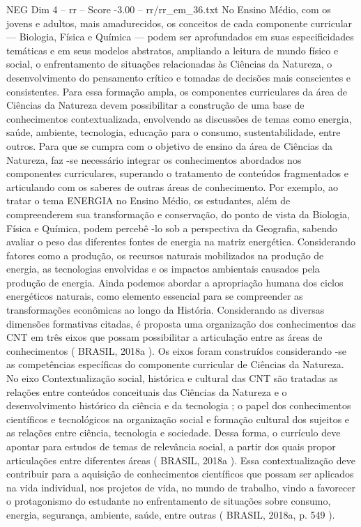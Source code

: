 \begin{textsample}{NEG Dim 4 – rr – Score -3.00 – rr/rr\_em\_36.txt}
No Ensino Médio, com os jovens e adultos, mais amadurecidos, os conceitos de cada componente curricular — Biologia, Física e Química — podem ser aprofundados em suas especificidades temáticas e em seus modelos abstratos, ampliando a leitura de mundo físico e social, o enfrentamento de situações relacionadas às Ciências da Natureza, o desenvolvimento do pensamento crítico e tomadas de decisões mais conscientes e consistentes.
Para essa formação ampla, os componentes curriculares da área de Ciências da Natureza devem possibilitar a construção de uma base de conhecimentos contextualizada, envolvendo as discussões de temas como energia, saúde, ambiente, tecnologia, educação para o consumo, sustentabilidade, entre outros.
Para que se cumpra com o objetivo de ensino da área de Ciências da Natureza, faz -se necessário integrar os conhecimentos abordados nos componentes curriculares, superando o tratamento de conteúdos fragmentados e articulando com os saberes de outras áreas de conhecimento.
Por exemplo, ao tratar o tema ENERGIA no Ensino Médio, os estudantes, além de compreenderem sua transformação e conservação, do ponto de vista da Biologia, Física e Química, podem percebê -lo sob a perspectiva da Geografia, sabendo avaliar o peso das diferentes fontes de energia na matriz energética.
Considerando fatores como a produção, os recursos naturais mobilizados na produção de energia, as tecnologias envolvidas e os impactos ambientais causados pela produção de energia.
Ainda podemos abordar a apropriação humana dos ciclos energéticos naturais, como elemento essencial para se compreender as transformações econômicas ao longo da História.
Considerando as diversas dimensões formativas citadas, é proposta uma organização dos conhecimentos das CNT em três eixos que possam possibilitar a articulação entre as áreas de conhecimentos ( BRASIL, 2018a ).
Os eixos foram construídos considerando -se as competências específicas do componente curricular de Ciências da Natureza.
No eixo Contextualização social, histórica e cultural das CNT são tratadas as relações entre conteúdos conceituais das Ciências da Natureza e o desenvolvimento histórico da ciência e da tecnologia ; o papel dos conhecimentos científicos e tecnológicos na organização social e formação cultural dos sujeitos e as relações entre ciência, tecnologia e sociedade.
Dessa forma, o currículo deve apontar para estudos de temas de relevância social, a partir dos quais propor articulações entre diferentes áreas ( BRASIL, 2018a ).
Essa contextualização deve contribuir para a aquisição de conhecimentos científicos que possam ser aplicados na vida individual, nos projetos de vida, no mundo de trabalho, vindo a favorecer o protagonismo do estudante no enfrentamento de situações sobre consumo, energia, segurança, ambiente, saúde, entre outras ( BRASIL, 2018a, p. 549 ).

\end{textsample}
